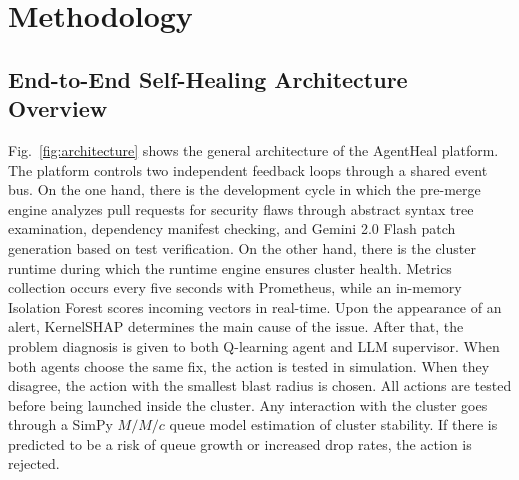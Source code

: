\documentclass[10pt,conference]{IEEEtran}
\begin{document}
\section{Methodology}

\subsection{End-to-End Self-Healing Architecture Overview}

Fig.~\ref{fig:architecture} shows the general architecture of the AgentHeal platform. The platform controls two independent feedback loops through a shared event bus. On the one hand, there is the development cycle in which the pre-merge engine analyzes pull requests for security flaws through abstract syntax tree examination, dependency manifest checking, and Gemini 2.0 Flash patch generation based on test verification. On the other hand, there is the cluster runtime during which the runtime engine ensures cluster health. Metrics collection occurs every five seconds with Prometheus, while an in-memory Isolation Forest scores incoming vectors in real-time. Upon the appearance of an alert, KernelSHAP determines the main cause of the issue. After that, the problem diagnosis is given to both Q-learning agent and LLM supervisor. When both agents choose the same fix, the action is tested in simulation. When they disagree, the action with the smallest blast radius is chosen. All actions are tested before being launched inside the cluster. Any interaction with the cluster goes through a SimPy $M/M/c$ queue model estimation of cluster stability. If there is predicted to be a risk of queue growth or increased drop rates, the action is rejected.
\end{document}

